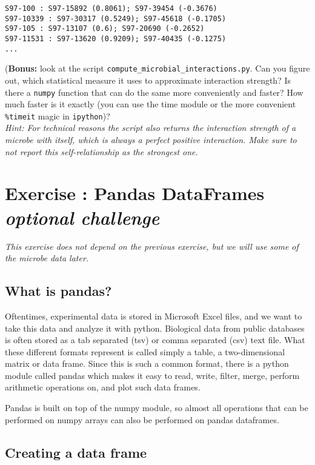 \documentclass[12pt]{article}
\begin{document}
\begin{verbatim}
S97-100 : S97-15892 (0.8061); S97-39454 (-0.3676)
S97-10339 : S97-30317 (0.5249); S97-45618 (-0.1705)
S97-105 : S97-13107 (0.6); S97-20690 (-0.2652)
S97-11531 : S97-13620 (0.9209); S97-40435 (-0.1275)
...
\end{verbatim}

\noindent(\textbf{Bonus:} look at the script \texttt{compute\_microbial\_interactions.py}. Can you figure out, which statistical measure it uses to approximate interaction strength? Is there a \texttt{numpy} function that can do the same more conveniently and faster? How much faster is it exactly (you can use the time module or the more convenient \texttt{\%timeit} magic in \texttt{ipython})?\\

\noindent\emph{Hint: For technical reasons the script also returns the interaction strength of a microbe with itself, which is always a perfect positive interaction. Make sure to not report this self-relationship as the strongest one.}



\section{Exercise : Pandas DataFrames\\ \emph{\color{red} optional challenge}}

\textit{This exercise does not depend on the previous exercise, but we will use some of the microbe data later.}

\subsection*{What is pandas?}
Oftentimes, experimental data is stored in Microsoft Excel files, and we want to take this data and analyze it with python. Biological data from public databases is often stored as a tab separated (tsv) or comma separated (csv) text file. What these different formats represent is called simply a table, a two-dimensional matrix or data frame. Since this is such a common format, there is a python module called pandas which makes it easy to read, write, filter, merge, perform arithmetic operations on, and plot such data frames. 

Pandas is built on top of the numpy module, so almost all operations that can be performed on numpy arrays can also be performed on pandas dataframes.

\subsection{Creating a data frame}
\end{document}
